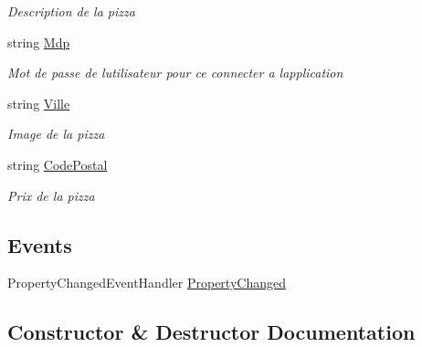 \begin{DoxyCompactItemize}
\begin{DoxyCompactList}\small\item\em Description de la pizza \end{DoxyCompactList}\item 
string \hyperlink{classModele_1_1Utilisateur_a6da26e59e09412a036824cf27dac6976}{Mdp}
\begin{DoxyCompactList}\small\item\em Mot de passe de l\textquotesingle{}utilisateur pour ce connecter a l\textquotesingle{}application \end{DoxyCompactList}\item 
string \hyperlink{classModele_1_1Utilisateur_add873e1f9c9c49bc1ab75d4850a41aa8}{Ville}
\begin{DoxyCompactList}\small\item\em Image de la pizza \end{DoxyCompactList}\item 
string \hyperlink{classModele_1_1Utilisateur_a5f92f22eba78e5b4cccccc1936351886}{Code\+Postal}
\begin{DoxyCompactList}\small\item\em Prix de la pizza \end{DoxyCompactList}\end{DoxyCompactItemize}
\subsection*{Events}
\begin{DoxyCompactItemize}
\item 
Property\+Changed\+Event\+Handler \hyperlink{classModele_1_1Utilisateur_a74ad3e3725762ef45b34238f0b1cebc7}{Property\+Changed}
\end{DoxyCompactItemize}


\subsection{Constructor \& Destructor Documentation}
\mbox{\label{classModele_1_1Utilisateur_a1d5c1f87797e60515771e6510c264436}} 
